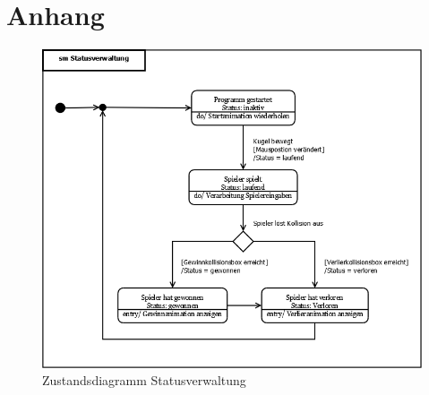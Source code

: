 \chapter{Anhang}
\begin{figure}[h]
\caption{Zustandsdiagramm Statusverwaltung}
\centering
\includegraphics[scale=0.375]{Bilder/Diagramme/smStatusverwaltung.png}
\end{figure}